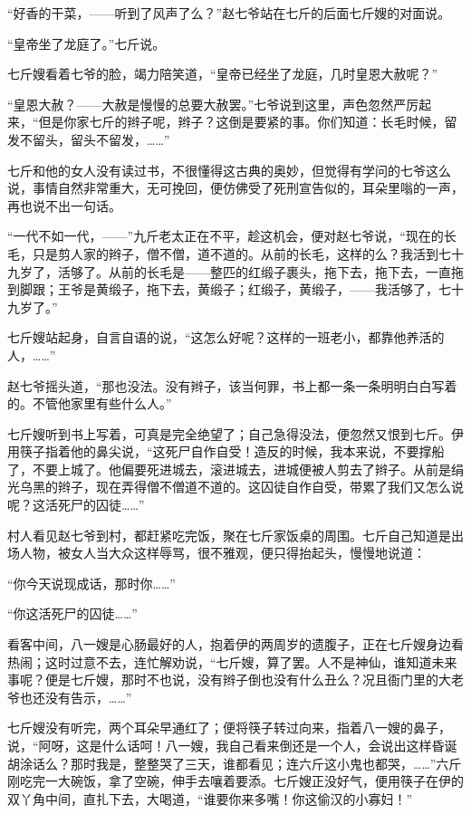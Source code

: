 \documentclass[12pt,UTF8]{ctexbook}
\begin{document}
“好香的干菜，——听到了风声了么？”赵七爷站在七斤的后面七斤嫂的对面说。

“皇帝坐了龙庭了。”七斤说。

七斤嫂看着七爷的脸，竭力陪笑道，“皇帝已经坐了龙庭，几时皇恩大赦呢？”

“皇恩大赦？——大赦是慢慢的总要大赦罢。”七爷说到这里，声色忽然严厉起来，“但是你家七斤的辫子呢，辫子？这倒是要紧的事。你们知道：长毛时候，留发不留头，留头不留发，……”

七斤和他的女人没有读过书，不很懂得这古典的奥妙，但觉得有学问的七爷这么说，事情自然非常重大，无可挽回，便仿佛受了死刑宣告似的，耳朵里嗡的一声，再也说不出一句话。

“一代不如一代，——”九斤老太正在不平，趁这机会，便对赵七爷说，“现在的长毛，只是剪人家的辫子，僧不僧，道不道的。从前的长毛，这样的么？我活到七十九岁了，活够了。从前的长毛是——整匹的红缎子裹头，拖下去，拖下去，一直拖到脚跟；王爷是黄缎子，拖下去，黄缎子；红缎子，黄缎子，——我活够了，七十九岁了。”

七斤嫂站起身，自言自语的说，“这怎么好呢？这样的一班老小，都靠他养活的人，……”

赵七爷摇头道，“那也没法。没有辫子，该当何罪，书上都一条一条明明白白写着的。不管他家里有些什么人。”

七斤嫂听到书上写着，可真是完全绝望了；自己急得没法，便忽然又恨到七斤。伊用筷子指着他的鼻尖说，“这死尸自作自受！造反的时候，我本来说，不要撑船了，不要上城了。他偏要死进城去，滚进城去，进城便被人剪去了辫子。从前是绢光乌黑的辫子，现在弄得僧不僧道不道的。这囚徒自作自受，带累了我们又怎么说呢？这活死尸的囚徒……”

村人看见赵七爷到村，都赶紧吃完饭，聚在七斤家饭桌的周围。七斤自己知道是出场人物，被女人当大众这样辱骂，很不雅观，便只得抬起头，慢慢地说道：

“你今天说现成话，那时你……”

“你这活死尸的囚徒……”

看客中间，八一嫂是心肠最好的人，抱着伊的两周岁的遗腹子，正在七斤嫂身边看热闹；这时过意不去，连忙解劝说，“七斤嫂，算了罢。人不是神仙，谁知道未来事呢？便是七斤嫂，那时不也说，没有辫子倒也没有什么丑么？况且衙门里的大老爷也还没有告示，……”

七斤嫂没有听完，两个耳朵早通红了；便将筷子转过向来，指着八一嫂的鼻子，说，“阿呀，这是什么话呵！八一嫂，我自己看来倒还是一个人，会说出这样昏诞胡涂话么？那时我是，整整哭了三天，谁都看见；连六斤这小鬼也都哭，……”六斤刚吃完一大碗饭，拿了空碗，伸手去嚷着要添。七斤嫂正没好气，便用筷子在伊的双丫角中间，直扎下去，大喝道，“谁要你来多嘴！你这偷汉的小寡妇！”
\end{document}
